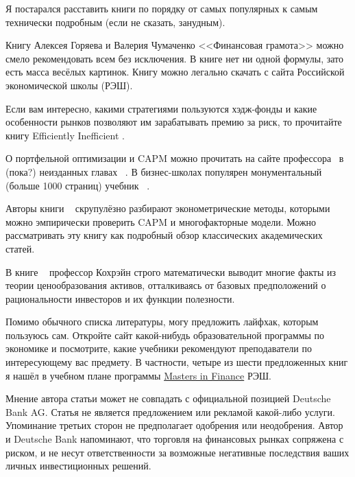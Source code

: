 Я постарался расставить книги по порядку от самых популярных к самым технически 
подробным (если не сказать, занудным).

Книгу Алексея Горяева и Валерия Чумаченко <<Финансовая грамота>> 
\cite{goryaev2009} можно смело рекомендовать всем без исключения. В книге нет 
ни одной формулы, зато есть масса весёлых картинок. Книгу можно легально скачать с 
сайта Российской экономической школы (РЭШ).

Если вам интересно, какими стратегиями пользуются хэдж-фонды и какие 
особенности рынков позволяют им зарабатывать премию за риск, то прочитайте 
книгу Efficiently Inefficient \cite{pedersen2015efficiently}.

О портфельной оптимизации и CAPM можно прочитать на сайте профессора \ в (пока?) неизданных главах \ 
\cite{welch}. В бизнес-школах популярен монументальный (больше 1000 страниц) 
учебник \en{Investments}\ \cite{bodie2014investments}.

Авторы книги \ \cite{bali2016empirical} скрупулёзно 
разбирают эконометрические методы, которыми можно эмпирически проверить CAPM и 
многофакторные модели. Можно рассматривать эту книгу как подробный обзор 
классических академических статей.

В книге \ \cite{cochrane2005asset} профессор Кохрэйн строго 
математически выводит многие факты из теории ценообразования активов, 
отталкиваясь от базовых предположений о рациональности инвесторов и их 
функции полезности.

Помимо обычного списка литературы, могу предложить лайфхак, которым пользуюсь 
сам. Откройте сайт какой-нибудь образовательной программы по экономике и 
посмотрите, какие учебники рекомендуют преподаватели по интересующему вас 
предмету. В частности, четыре из шести предложенных книг я нашёл в учебном 
плане программы \href{https://www.nes.ru/MiF-uchplan?lang=ru}{Masters in 
Finance} РЭШ.

\clearpage
{}

Мнение автора статьи может не совпадать с официальной позицией Deutsche Bank 
AG. Статья не является предложением или рекламой какой-либо услуги. Упоминание
третьих сторон не предполагает одобрения или неодобрения. Автор и Deutsche Bank
напоминают, что торговля на финансовых рынках сопряжена с риском, и не несут
ответственности за возможные негативные последствия ваших личных инвестиционных
решений.

\clearpage
{}
\en{
\printbibliography[heading = none]
}

